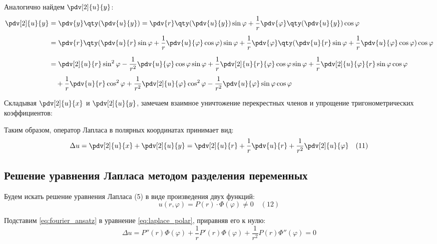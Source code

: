 \begin{proofbox}
	Аналогично найдем $\pdv[2]{u}{y}$:
	\begin{align*}
		\pdv[2]{u}{y} &= \pdv{y}\qty(\pdv{u}{y}) = \pdv{r}\qty(\pdv{u}{y})\sin\varphi + \frac{1}{r}\pdv{\varphi}\qty(\pdv{u}{y})\cos\varphi \\[1ex]
		&= \pdv{r}\qty(\pdv{u}{r}\sin\varphi + \frac{1}{r}\pdv{u}{\varphi}\cos\varphi)\sin\varphi + \frac{1}{r}\pdv{\varphi}\qty(\pdv{u}{r}\sin\varphi + \frac{1}{r}\pdv{u}{\varphi}\cos\varphi)\cos\varphi \\[1.5ex]
		&= \pdv[2]{u}{r}\sin^2\varphi - \frac{1}{r^2}\pdv{u}{\varphi}\cos\varphi\sin\varphi + \frac{1}{r}\pdv[2]{u}{r}{\varphi}\cos\varphi\sin\varphi + \frac{1}{r}\pdv[2]{u}{\varphi}{r}\sin\varphi\cos\varphi \\[1ex]
		&\quad + \frac{1}{r}\pdv{u}{r}\cos^2\varphi + \frac{1}{r^2}\pdv[2]{u}{\varphi}\cos^2\varphi - \frac{1}{r^2}\pdv{u}{\varphi}\sin\varphi\cos\varphi
	\end{align*}
	
	Складывая $\pdv[2]{u}{x}$ и $\pdv[2]{u}{y}$, замечаем взаимное уничтожение перекрестных членов и упрощение тригонометрических коэффициентов:
\end{proofbox}

Таким образом, оператор Лапласа в полярных координатах принимает вид:
\begin{equation} \label{eq:laplace_polar}
	\Delta u = \pdv[2]{u}{x} + \pdv[2]{u}{y} = \pdv[2]{u}{r} + \frac{1}{r}\pdv{u}{r} + \frac{1}{r^2}\pdv[2]{u}{\varphi} \quad (11)
\end{equation}

\subsection{Решение уравнения Лапласа методом разделения переменных}

Будем искать решение уравнения Лапласа (5) в виде произведения двух функций:
\begin{equation} \label{eq:fourier_ansatz}
	u(r,\varphi) = P(r) \cdot \Phi(\varphi) \neq 0 \quad (12)
\end{equation}

Подставим \eqref{eq:fourier_ansatz} в уравнение \eqref{eq:laplace_polar}, приравняв его к нулю:
\begin{equation*}
	\Delta u = P''(r)\Phi(\varphi) + \frac{1}{r} P'(r)\Phi(\varphi) + \frac{1}{r^2} P(r)\Phi''(\varphi) = 0
\end{equation*}

